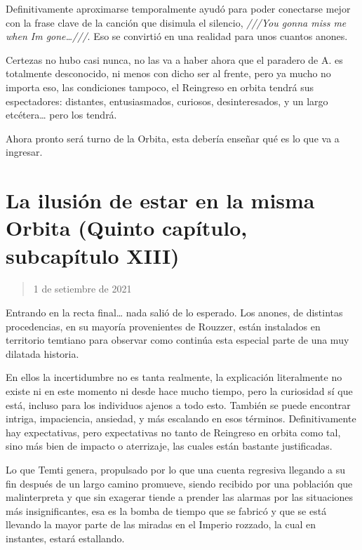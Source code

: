 \documentclass[
  spanish,
]{book}
\begin{document}
Definitivamente aproximarse temporalmente ayudó para poder conectarse mejor con la frase clave de la canción que disimula el silencio, \emph{///You gonna miss me when Im gone\ldots///}. Eso se convirtió en una realidad para unos cuantos anones.

Certezas no hubo casi nunca, no las va a haber ahora que el paradero de A. es totalmente desconocido, ni menos con dicho ser al frente, pero ya mucho no importa eso, las condiciones tampoco, el Reingreso en orbita tendrá sus espectadores: distantes, entusiasmados, curiosos, desinteresados, y un largo etcétera\ldots{} pero los tendrá.

Ahora pronto será turno de la Orbita, esta debería enseñar qué es lo que va a ingresar.

\hypertarget{la-ilusiuxf3n-de-estar-en-la-misma-orbita-quinto-capuxedtulo-subcapuxedtulo-xiii}{%
\section{La ilusión de estar en la misma Orbita (Quinto capítulo, subcapítulo XIII)}\label{la-ilusiuxf3n-de-estar-en-la-misma-orbita-quinto-capuxedtulo-subcapuxedtulo-xiii}}

\begin{quote}
1 de setiembre de 2021
\end{quote}

Entrando en la recta final\ldots{} nada salió de lo esperado.
Los anones, de distintas procedencias, en su mayoría provenientes de Rouzzer, están instalados en territorio temtiano para observar como continúa esta especial parte de una muy dilatada historia.

En ellos la incertidumbre no es tanta realmente, la explicación literalmente no existe ni en este momento ni desde hace mucho tiempo, pero la curiosidad sí que está, incluso para los individuos ajenos a todo esto. También se puede encontrar intriga, impaciencia, ansiedad, y más escalando en esos términos. Definitivamente hay expectativas, pero expectativas no tanto de Reingreso en orbita como tal, sino más bien de impacto o aterrizaje, las cuales están bastante justificadas.

Lo que Temti genera, propulsado por lo que una cuenta regresiva llegando a su fin después de un largo camino promueve, siendo recibido por una población que malinterpreta y que sin exagerar tiende a prender las alarmas por las situaciones más insignificantes, esa es la bomba de tiempo que se fabricó y que se está llevando la mayor parte de las miradas en el Imperio rozzado, la cual en instantes, estará estallando.
\end{document}
